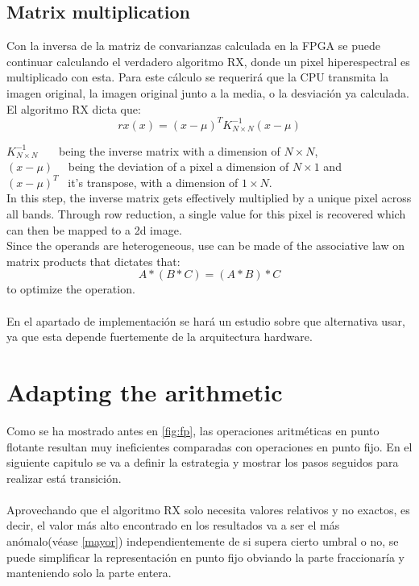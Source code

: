 \subsection{Matrix multiplication}
Con la inversa de la matriz de convarianzas calculada en la FPGA se puede continuar calculando el verdadero algoritmo RX, donde un pixel hiperespectral es multiplicado con esta. Para este cálculo se requerirá que la CPU transmita la imagen original, la imagen original junto a la media, o la desviación ya calculada.
\\
\noindent El algoritmo RX dicta que:
\[ rx(x) = (x-\mu)^{T} K^{-1}_{N \times N} (x-\mu) \]


\indent \(K^{-1}_{N \times N}\) \ \ \ being the inverse matrix with a dimension of \(N \times N\),\\
\indent \((x-\mu)\) \ \	being the deviation of a pixel a dimension of \(N \times 1\) and \\			
\indent \((x-\mu)^{T}\) \ it's transpose, with a dimension of \(1 \times N\).\\

In this step, the inverse matrix gets effectively multiplied by a unique pixel across all bands. Through row reduction, a single value for this pixel is recovered which can then be mapped to a 2d image.\\

Since the operands are heterogeneous, use can be made of the associative law on matrix products that dictates that:
	\[A * (B * C) = (A * B) * C\]
	to optimize the operation.\\


\paragraph{}
\label{alternativa}
En el apartado de implementación se hará un estudio sobre que alternativa usar, ya que esta depende fuertemente de la arquitectura hardware.

\section{Adapting the arithmetic}
Como se ha mostrado antes en \autoref{fig:fp}, las operaciones aritméticas en punto flotante resultan muy ineficientes comparadas con operaciones en punto fijo. En el siguiente capitulo se va a definir la estrategia y mostrar los pasos seguidos para realizar está transición.
\\
\\
Aprovechando que el algoritmo RX solo necesita valores relativos y no exactos, es decir, el valor más alto encontrado en los resultados va a ser el más anómalo(véase \ref{mayor}) independientemente de si supera cierto umbral o no, se puede simplificar la representación en punto fijo obviando la parte fraccionaría y manteniendo solo la parte entera.

